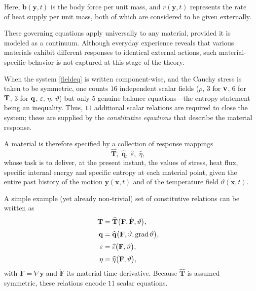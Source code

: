 Here, \( \mathbf{b}(\mathbf{y}, t) \) is the body force per unit mass, and \( r(\mathbf{y}, t) \) represents the rate of heat supply per unit mass, both of which are considered to be given externally.

\vspace{1em}

These governing equations apply universally to any material, provided it is modeled as a continuum. Although everyday experience reveals that various materials exhibit different responses to identical external actions, such material-specific behavior is not captured at this stage of the theory.


When the system \eqref{fieldeq} is written component-wise, and the Cauchy
stress is taken to be symmetric, one counts
\(16\) independent scalar fields ($\rho$, 3 for $\mathbf{v}$, 6 for $\mathbf{T}$, 3 for $\mathbf{q}$, $\varepsilon$, $\eta$, $\vartheta$) but only \(5\) genuine balance
equations—the entropy statement being an inequality.
Thus, \(11\) additional scalar relations are required to close the
system; these are supplied by the
\emph{constitutive equations} that describe the material response.

\vspace{0.5em}

\noindent
A material is therefore specified by a collection of response mappings
\[
\widehat{\mathbf{T}},\;
\widehat{\mathbf{q}},\;
\widehat{\varepsilon},\;
\widehat{\eta},
\]
whose task is to deliver, at the present instant, the values of
stress, heat flux, specific internal energy and specific entropy at
each material point, given the entire past history of the motion
\(\mathbf{y}(\mathbf{x},t)\) and of the temperature field
\(\vartheta(\mathbf{x},t)\).

\vspace{0.5em}

\noindent
A simple example (yet already non-trivial) set of constitutive
relations can be written as
\begin{equation}
		\begin{aligned}
			\mathbf{T} &= \widehat{\mathbf{T}}\bigl(\mathbf{F},\dot{\mathbf{F}},\vartheta\bigr),\\[2pt]
			\mathbf{q} &= \widehat{\mathbf{q}}\bigl(\mathbf{F},\vartheta,\operatorname{grad}\vartheta\bigr),\\[2pt]
			\varepsilon &= \widehat{\varepsilon}\bigl(\mathbf{F},\vartheta\bigr),\\[2pt]
			\eta &= \widehat{\eta}\bigl(\mathbf{F},\vartheta\bigr),
	\end{aligned}
\end{equation}
with \(\mathbf{F} = \nabla\mathbf{y}\) and
\(\dot{\mathbf{F}}\) its material time derivative.
Because \(\widehat{\mathbf{T}}\) is assumed symmetric, these relations
encode \(11\) scalar equations.


